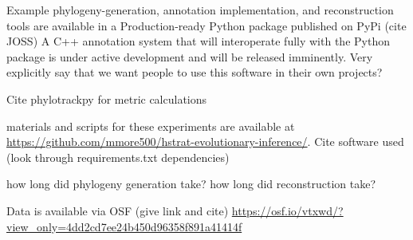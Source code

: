 Example phylogeny-generation, annotation implementation, and reconstruction tools are available in a Production-ready Python package published on PyPi (cite JOSS) A C++ annotation system that will interoperate fully with the Python package is under active development and will be released imminently.
Very explicitly say that we want people to use this software in their own projects?

Cite phylotrackpy for metric calculations

materials and scripts for these experiments are available at \url{https://github.com/mmore500/hstrat-evolutionary-inference/}. Cite software used (look through requirements.txt dependencies)

how long did phylogeny generation take? how long did reconstruction take?

Data is available via OSF (give link and cite) 
\url{https://osf.io/vtxwd/?view_only=4dd2cd7ee24b450d96358f891a41414f}
